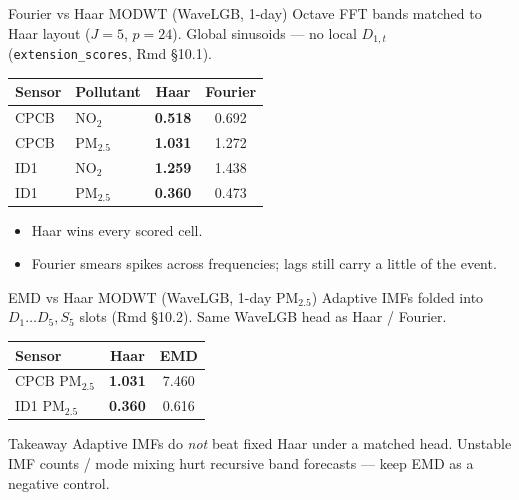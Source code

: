 \begin{frame}{Fourier vs Haar MODWT (WaveLGB, 1-day)}
  {\footnotesize
  Octave FFT bands matched to Haar layout ($J{=}5$, $p{=}24$).
  Global sinusoids --- no local $D_{1,t}$ (\texttt{extension\_scores}, Rmd §10.1).
  }
  \vspace{0.35em}
  {\scriptsize
  \centering
  \begin{tabular}{llcc}
    \toprule
    Sensor & Pollutant & Haar & Fourier \\
    \midrule
    CPCB & NO$_2$     & \textbf{0.518} & 0.692 \\
    CPCB & PM$_{2.5}$ & \textbf{1.031} & 1.272 \\
    ID1  & NO$_2$     & \textbf{1.259} & 1.438 \\
    ID1  & PM$_{2.5}$ & \textbf{0.360} & 0.473 \\
    \bottomrule
  \end{tabular}
  }
  \vspace{0.45em}
  \begin{itemize}
    \item Haar wins every scored cell.
    \item Fourier smears spikes across frequencies; lags still carry a little of the event.
  \end{itemize}
\end{frame}

\begin{frame}{EMD vs Haar MODWT (WaveLGB, 1-day PM$_{2.5}$)}
  {\footnotesize
  Adaptive IMFs folded into $D_1{\ldots}D_5,S_5$ slots (Rmd §10.2).
  Same WaveLGB head as Haar / Fourier.
  }
  \vspace{0.35em}
  {\scriptsize
  \centering
  \begin{tabular}{lcc}
    \toprule
    Sensor & Haar & EMD \\
    \midrule
    CPCB PM$_{2.5}$ & \textbf{1.031} & 7.460 \\
    ID1  PM$_{2.5}$ & \textbf{0.360} & 0.616 \\
    \bottomrule
  \end{tabular}
  }
  \vspace{0.45em}
  \begin{alertblock}{Takeaway}
    Adaptive IMFs do \emph{not} beat fixed Haar under a matched head.
    Unstable IMF counts / mode mixing hurt recursive band forecasts ---
    keep EMD as a negative control.
  \end{alertblock}
\end{frame}

